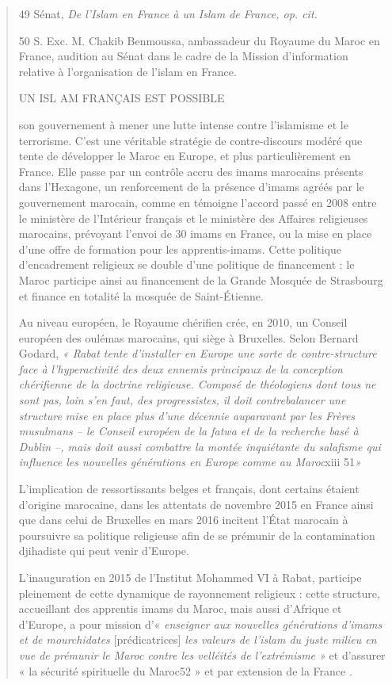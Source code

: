 \begin{quote}
49 Sénat, \emph{De l'Islam en France à un Islam de France, op. cit.}

50 S. Exc. M. Chakib Benmoussa, ambassadeur du Royaume du Maroc en
France, audition au Sénat dans le cadre de la Mission d'information
relative à l'organisation de l'islam en France.

UN ISL AM FRANÇAIS EST POSSIBLE

son gouvernement à mener une lutte intense contre l'islamisme et le
terrorisme. C'est une véritable stratégie de contre-discours modéré que
tente de développer le Maroc en Europe, et plus particulièrement en
France. Elle passe par un contrôle accru des imams marocains présents
dans l'Hexagone, un renforcement de la présence d'imams agréés par le
gouvernement marocain, comme en témoigne l'accord passé en 2008 entre le
ministère de l'Intérieur français et le ministère des Affaires
religieuses marocains, prévoyant l'envoi de 30 imams en France, ou la
mise en place d'une offre de formation pour les apprentis-imams. Cette
politique d'encadrement religieux se double d'une politique de
financement : le Maroc participe ainsi au financement de la Grande
Mosquée de Strasbourg et finance en totalité la mosquée de
Saint-Étienne.

Au niveau européen, le Royaume chérifien crée, en 2010, un Conseil
européen des oulémas marocains, qui siège à Bruxelles. Selon Bernard
Godard, \emph{« Rabat tente d'installer en Europe une sorte de
contre-structure face à l'hyperactivité des deux ennemis principaux de
la conception chérifienne de la doctrine religieuse. Composé de
théologiens dont tous ne sont pas, loin s'en faut, des progressistes, il
doit contrebalancer une structure mise en place plus d'une décennie
auparavant par les Frères musulmans -- le Conseil européen de la fatwa
et de la recherche basé à Dublin --, mais doit aussi combattre la montée
inquiétante du salafisme qui influence les nouvelles générations en
Europe comme au Maroc}xiii 51\emph{»}

L'implication de ressortissants belges et français, dont certains
étaient d'origine marocaine, dans les attentats de novembre 2015 en
France ainsi que dans celui de Bruxelles en mars 2016 incitent l'État
marocain à poursuivre sa politique religieuse afin de se prémunir de la
contamination djihadiste qui peut venir d'Europe.

L'inauguration en 2015 de l'Institut Mohammed VI à Rabat, participe
pleinement de cette dynamique de rayonnement religieux : cette
structure, accueillant des apprentis imams du Maroc, mais aussi
d'Afrique et d'Europe, a pour mission d'« \emph{enseigner aux nouvelles
générations d'imams et de mourchidates} {[}prédicatrices{]} \emph{les
valeurs de l'islam du juste milieu en vue de prémunir le Maroc contre
les velléités de l'extrémisme »} et d'assurer « la sécurité spirituelle
du Maroc52 » et par extension de la France .


\end{quote}
